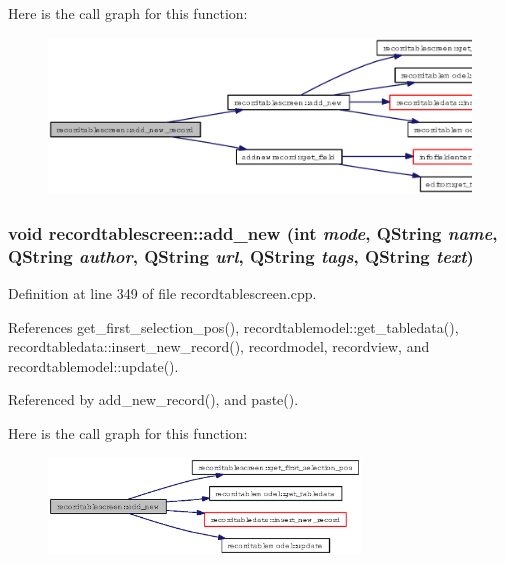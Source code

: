Here is the call graph for this function:\begin{figure}[H]
\begin{center}
\leavevmode
\includegraphics[width=352pt]{classrecordtablescreen_e52ce4d7625ab4d1a78938b3028652be_cgraph}
\end{center}
\end{figure}
\subsubsection{\setlength{\rightskip}{0pt plus 5cm}void recordtablescreen::add\_\-new (int {\em mode}, QString {\em name}, QString {\em author}, QString {\em url}, QString {\em tags}, QString {\em text})\hspace{0.3cm}{\tt  [private]}}\label{classrecordtablescreen_e3e3b5770bfdb550262ff4dab723599a}




Definition at line 349 of file recordtablescreen.cpp.

References get\_\-first\_\-selection\_\-pos(), recordtablemodel::get\_\-tabledata(), recordtabledata::insert\_\-new\_\-record(), recordmodel, recordview, and recordtablemodel::update().

Referenced by add\_\-new\_\-record(), and paste().

Here is the call graph for this function:\begin{figure}[H]
\begin{center}
\leavevmode
\includegraphics[width=235pt]{classrecordtablescreen_e3e3b5770bfdb550262ff4dab723599a_cgraph}
\end{center}
\end{figure}


